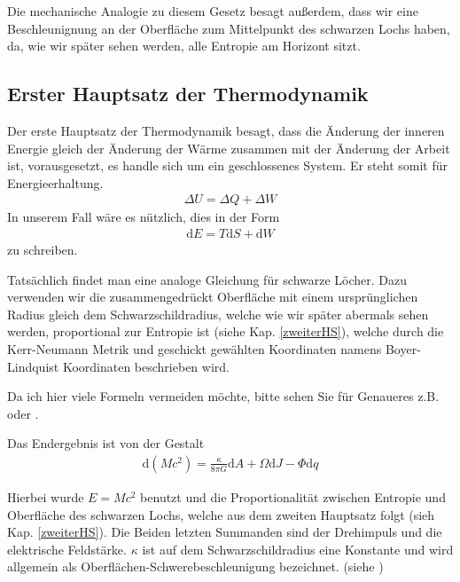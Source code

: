 \documentclass[ngerman]{scrartcl}
\newcommand{\diff}{\mathrm{d}}
\begin{document}
	Die mechanische Analogie zu diesem Gesetz besagt außerdem, dass wir eine Beschleunignung an der Oberfläche zum Mittelpunkt des schwarzen Lochs haben, da, wie wir später sehen werden, alle Entropie am Horizont sitzt. 

	\subsection{Erster Hauptsatz der Thermodynamik}
	Der erste Hauptsatz der Thermodynamik besagt, dass die Änderung der inneren Energie gleich der Änderung der Wärme zusammen mit der Änderung der Arbeit ist, vorausgesetzt, es handle sich um ein geschlossenes System. Er steht somit für Energieerhaltung.
		\begin{align}
			\Delta U = \Delta Q + \Delta W
		\end{align}
	In unserem Fall wäre es nützlich, dies in der Form
		\begin{align}
			\diff E = T\diff S + \diff W
		\end{align}
	zu schreiben. 
	
	Tatsächlich findet man eine analoge Gleichung für schwarze Löcher.
	Dazu verwenden wir die zusammengedrückt Oberfläche mit einem ursprünglichen Radius gleich dem Schwarzschildradius, welche wie wir später abermals sehen werden, proportional zur Entropie ist (siehe Kap. \ref{zweiterHS}), welche durch die Kerr-Neumann Metrik und geschickt gewählten Koordinaten namens Boyer-Lindquist Koordinaten beschrieben wird. 
	
	Da ich hier viele Formeln vermeiden möchte, bitte sehen Sie für Genaueres z.B. \cite{BekensteinHawking} oder \cite{Gebhardt}.
	
	Das Endergebnis ist von der Gestalt
		\begin{align} \label{1HS}
			\diff (Mc^2) = \frac{\kappa}{8 \pi G} \diff A + \Omega \diff J - \Phi \diff q
		\end{align} 
	
	Hierbei wurde $E = Mc^2$ benutzt und die Proportionalität zwischen Entropie und Oberfläche des schwarzen Lochs, welche aus dem zweiten Hauptsatz folgt (sieh Kap. \ref{zweiterHS}). Die Beiden letzten Summanden sind der Drehimpuls und die elektrische Feldstärke. $\kappa$ ist auf dem Schwarzschildradius eine Konstante und wird allgemein als Oberflächen-Schwerebeschleunigung bezeichnet. (siehe \cite{Gebhardt})
	\\
	
\end{document}
